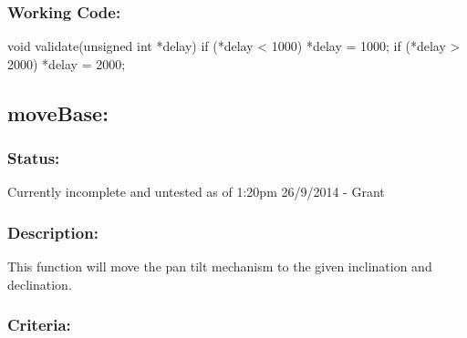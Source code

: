 \documentclass[]{article}
\begin{document}
\subsubsection{Working Code:}
void validate(unsigned int *delay)
{
	if (*delay < 1000)
	{
		*delay = 1000;
	}
	if (*delay > 2000)
	{
		*delay = 2000;
	}
}

\subsection{moveBase:}
\subsubsection{Status:}
Currently incomplete and untested as of 1:20pm 26/9/2014 - Grant

\subsubsection{Description:} 
This function will move the pan tilt mechanism to the given inclination and declination.

\subsubsection{Criteria:}

\newpage
\end{document}
